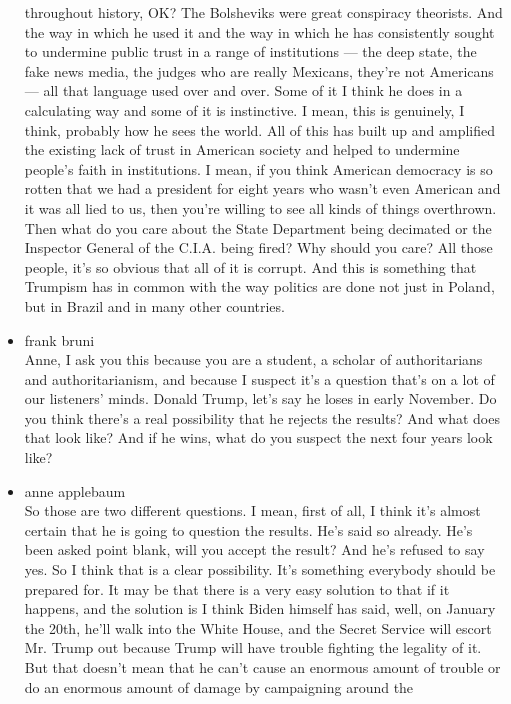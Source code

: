 \begin{itemize}
  throughout history, OK? The Bolsheviks were great conspiracy
  theorists. And the way in which he used it and the way in which he has
  consistently sought to undermine public trust in a range of
  institutions --- the deep state, the fake news media, the judges who
  are really Mexicans, they're not Americans --- all that language used
  over and over. Some of it I think he does in a calculating way and
  some of it is instinctive. I mean, this is genuinely, I think,
  probably how he sees the world. All of this has built up and amplified
  the existing lack of trust in American society and helped to undermine
  people's faith in institutions. I mean, if you think American
  democracy is so rotten that we had a president for eight years who
  wasn't even American and it was all lied to us, then you're willing to
  see all kinds of things overthrown. Then what do you care about the
  State Department being decimated or the Inspector General of the
  C.I.A. being fired? Why should you care? All those people, it's so
  obvious that all of it is corrupt. And this is something that Trumpism
  has in common with the way politics are done not just in Poland, but
  in Brazil and in many other countries.
\item
  frank bruni\\
  Anne, I ask you this because you are a student, a scholar of
  authoritarians and authoritarianism, and because I suspect it's a
  question that's on a lot of our listeners' minds. Donald Trump, let's
  say he loses in early November. Do you think there's a real
  possibility that he rejects the results? And what does that look like?
  And if he wins, what do you suspect the next four years look like?
\item
  anne applebaum\\
  So those are two different questions. I mean, first of all, I think
  it's almost certain that he is going to question the results. He's
  said so already. He's been asked point blank, will you accept the
  result? And he's refused to say yes. So I think that is a clear
  possibility. It's something everybody should be prepared for. It may
  be that there is a very easy solution to that if it happens, and the
  solution is I think Biden himself has said, well, on January the 20th,
  he'll walk into the White House, and the Secret Service will escort
  Mr. Trump out because Trump will have trouble fighting the legality of
  it. But that doesn't mean that he can't cause an enormous amount of
  trouble or do an enormous amount of damage by campaigning around the

\end{itemize}
